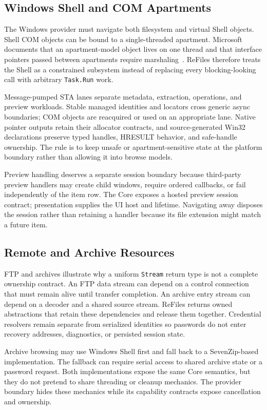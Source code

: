 \documentclass[10pt,a4paper,twoside]{article}
\begin{document}
\subsection{Windows Shell and COM Apartments}

The Windows provider must navigate both filesystem and virtual Shell objects. Shell COM objects can be bound to a
single-threaded apartment. Microsoft documents that an apartment-model object lives on one thread and that
interface pointers passed between apartments require marshaling~\cite{com-sta}. ReFiles therefore treats the
Shell as a constrained subsystem instead of replacing every blocking-looking call with arbitrary
\texttt{Task.Run} work.

Message-pumped STA lanes separate metadata, extraction, operations, and preview workloads. Stable managed
identities and locators cross generic async boundaries; COM objects are reacquired or used on an appropriate
lane. Native pointer outputs retain their allocator contracts, and source-generated Win32 declarations preserve
typed handles, HRESULT behavior, and safe-handle ownership. The rule is to keep unsafe or apartment-sensitive
state at the platform boundary rather than allowing it into browse models.

Preview handling deserves a separate session boundary because third-party preview handlers may create child
windows, require ordered callbacks, or fail independently of the item row. The Core exposes a hosted preview
session contract; presentation supplies the UI host and lifetime. Navigating away disposes the session rather
than retaining a handler because its file extension might match a future item.

\subsection{Remote and Archive Resources}

FTP and archives illustrate why a uniform \texttt{Stream} return type is not a complete ownership contract. An
FTP data stream can depend on a control connection that must remain alive until transfer completion. An archive
entry stream can depend on a decoder and a shared source stream. ReFiles returns owned abstractions that retain
these dependencies and release them together. Credential resolvers remain separate from serialized identities so
passwords do not enter recovery addresses, diagnostics, or persisted session state.

Archive browsing may use Windows Shell first and fall back to a SevenZip-based implementation. The fallback can
require serial access to shared archive state or a password request. Both implementations expose the same Core
semantics, but they do not pretend to share threading or cleanup mechanics. The provider boundary hides these
mechanics while its capability contracts expose cancellation and ownership.
\end{document}
